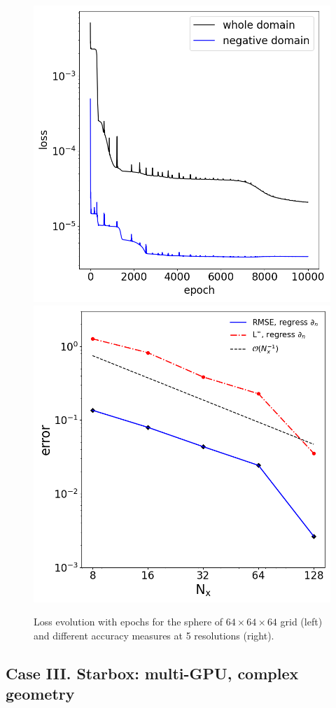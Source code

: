 \documentclass{elsarticle}
\begin{document}
\begin{figure}
	\centering
	\includegraphics[width=0.49\linewidth]{./figures/poisson_solver_loss_star_64x64x64_regress.png}
	\includegraphics[width=0.45\linewidth]{./figures/case_II_regression.png}
	\caption{Loss evolution with epochs for the sphere of $64\times 64\times 64$ grid (left) and different accuracy measures at 5 resolutions (right).}
	\label{fig:lossestar}
\end{figure}




\subsection{Case III. Starbox: multi-GPU, complex geometry}
\end{document}
